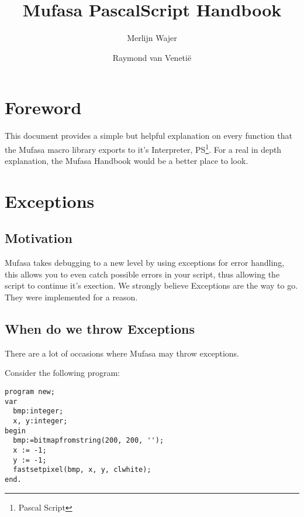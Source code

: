 \documentclass[a4paper]{report}
\begin{document}
\title{Mufasa PascalScript Handbook}
\author{Merlijn Wajer \and Raymond van Veneti\"{e}}


\def\pproc{\textbf{procedure}}
\def\pfunc{\textbf{function}}
\newcommand{\pvtype}[1]{{\color{typeGreen}{#1}}}
\newcommand{\pvname}[1]{{\color{typeRed}{#1}}}
\newcommand{\mname}[1]{{\color{blue}{#1}}}


\maketitle
\tableofcontents

\chapter{Foreword}

This document provides a simple but helpful explanation on every function that
the Mufasa macro library exports to it's Interpreter, PS\footnote{Pascal
Script}. For a real in depth explanation, the Mufasa Handbook would be a better
place to look.

\chapter{Exceptions}

\section{Motivation}
Mufasa takes debugging to a new level by using exceptions for error handling,
this allows you to even catch possible errors in your script, thus allowing
the script to continue it's exection. We strongly believe Exceptions are the
way to go. They were implemented for a reason.

\section{When do we throw Exceptions}

There are a lot of occasions where Mufasa may throw exceptions.

Consider the following program:

\begin{verbatim}
program new;
var
  bmp:integer;
  x, y:integer;
begin
  bmp:=bitmapfromstring(200, 200, '');
  x := -1;
  y := -1;
  fastsetpixel(bmp, x, y, clwhite);
end.
\end{verbatim}
\end{document}
